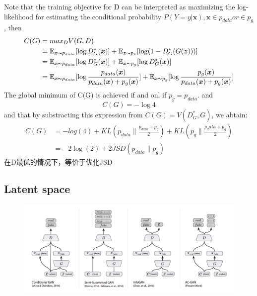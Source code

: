 Note that the training objective for D can be interpreted as maximizing the log-likelihood for
estimating the conditional probability $P(Y = y|\boldsymbol{x}), \boldsymbol{x} \in p_{data} or \in p_g$, then
\begin{equation}
    \begin{split}
        C(G) &= max_D V(G, D) \\
        &= \mathbb{E}_{\boldsymbol{x} \thicksim p_{data}}[\log D_G^*(\boldsymbol{x})] + \mathbb{E}_{\boldsymbol{z} \thicksim p_{\boldsymbol{z}}}[\log(1 - D_G^*(G(\boldsymbol{z})))] \\
        &= \mathbb{E}_{\boldsymbol{x} \thicksim p_{data}}[\log D_G^*(\boldsymbol{x})] + \mathbb{E}_{\boldsymbol{x} \thicksim p_{g}}[\log D_G^*(\boldsymbol{x})] \\
        &= \mathbb{E}_{\boldsymbol{x} \thicksim p_{data}}[\log \frac{p_{data}(\boldsymbol{x})}{p_{data}(\boldsymbol{x}) + p_g(\boldsymbol{x})}] + \mathbb{E}_{\boldsymbol{x} \thicksim p_g}[\log \frac{p_g(\boldsymbol{x})}{p_{data}(\boldsymbol{x}) + p_g(\boldsymbol{x})}]
    \end{split}
\end{equation}
The global minimum of C(G) is achieved if and onl if $p_g = p_{data}$. and
\begin{equation}
    C(G) = - \log 4
\end{equation}
and that by substracting this expression from $C(G) = V(D_G^*, G)$, we abtain:
\begin{equation}
    \begin{split}
        C(G) &= -log(4) + KL(p_{data}\| \frac{p_{data} + p_g}{2}) + KL(p_g \| \frac{p_data + p_g}{2}) \\
        &= -2\log(2) + 2JSD(p_{data}\|p_g)
    \end{split}
\end{equation}
在D最优的情况下，等价于优化JSD

\subsection{Latent space}
\begin{figure}[H]
    \centering
    \includegraphics[width=16cm]{images/cgan_acgan.png}
    \label{fig:CGAN2ACGAN}
\end{figure}

